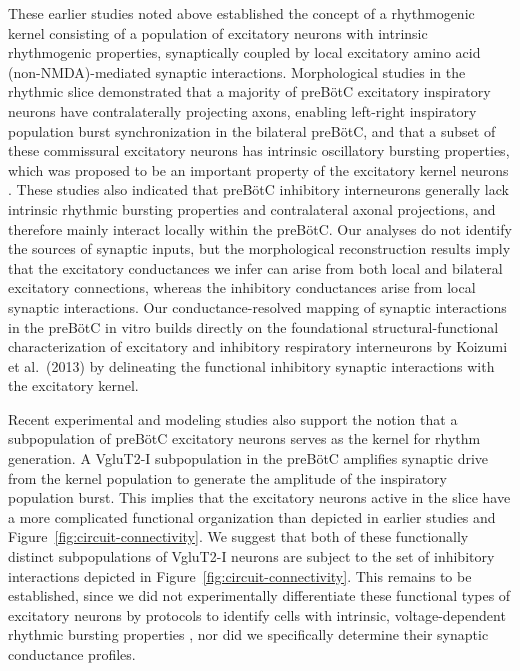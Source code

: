 \documentclass[
]{article}
\newcommand{\figref}[1]{Figure~\ref{#1}}
\begin{document}
These earlier studies noted above established the concept of a rhythmogenic kernel consisting of a population of excitatory neurons with intrinsic rhythmogenic properties, synaptically coupled by local excitatory amino acid (non-NMDA)-mediated synaptic interactions. Morphological studies in the rhythmic slice demonstrated that a majority of preBötC excitatory inspiratory neurons have contralaterally projecting axons, enabling left-right inspiratory population burst synchronization in the bilateral preBötC, and that a subset of these commissural excitatory neurons has intrinsic oscillatory bursting properties, which was proposed to be an important property of the excitatory kernel neurons \citep{koizumi2013structural}. These studies also indicated that preBötC inhibitory interneurons generally lack intrinsic rhythmic bursting properties and contralateral axonal projections, and therefore mainly interact locally within the preBötC. Our analyses do not identify the sources of synaptic inputs, but the morphological reconstruction results imply that the excitatory conductances we infer can arise from both local and bilateral excitatory connections, whereas the inhibitory conductances arise from local synaptic interactions. Our conductance-resolved mapping of synaptic interactions in the preBötC in vitro builds directly on the foundational structural-functional characterization of excitatory and inhibitory respiratory interneurons by Koizumi et al.\ (2013) by delineating the functional inhibitory synaptic interactions with the excitatory kernel.

Recent experimental and modeling studies \citep{phillips2019biophysical,phillips2022predictions} also support the notion that a subpopulation of preBötC excitatory neurons serves as the kernel for rhythm generation. A VgluT2-I subpopulation in the preBötC amplifies synaptic drive from the kernel population to generate the amplitude of the inspiratory population burst. This implies that the excitatory neurons active in the slice have a more complicated functional organization than depicted in earlier studies and \figref{fig:circuit-connectivity}. We suggest that both of these functionally distinct subpopulations of VgluT2-I neurons are subject to the set of inhibitory interactions depicted in \figref{fig:circuit-connectivity}. This remains to be established, since we did not experimentally differentiate these functional types of excitatory neurons by protocols to identify cells with intrinsic, voltage-dependent rhythmic bursting properties \citep[e.g.,][]{koizumi2013structural}, nor did we specifically determine their synaptic conductance profiles.
\end{document}
